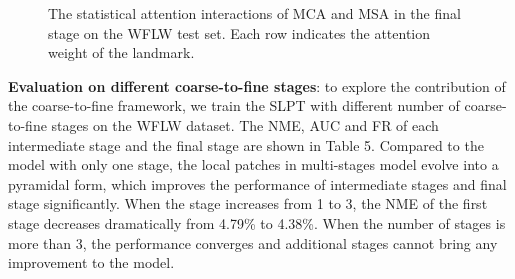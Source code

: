\documentclass[10pt,twocolumn,letterpaper]{article}
\begin{document}
\begin{figure*}[t!]
	\label{verifycluster}
	\centering
	\hspace{0.1cm}
	\hspace{0.1cm}
	\hspace{0.1cm}
	\hspace{0.1cm}
	\hspace{0.1cm}
	\hspace{0.1cm}
	\hspace{0.1cm}
	\hspace{0.1cm}
	\hspace{0.1cm}
	\hspace{0.1cm}
	\hspace{0.1cm}
	\hspace{0.1cm}	
	\caption{The statistical attention interactions of MCA and MSA in the final stage on the WFLW test set. Each row indicates the attention weight of the landmark.}
	\label{fig5}
\end{figure*}

\textbf{Evaluation on different coarse-to-fine stages}: to explore the contribution of the coarse-to-fine framework, we train the SLPT with different number of coarse-to-fine stages on the WFLW dataset. The NME, AUC and FR of each intermediate stage and the final stage are shown in Table 5. Compared to the model with only one stage, the local patches in multi-stages model evolve into a pyramidal form, which improves the performance of intermediate stages and final stage significantly. When the stage increases from 1 to 3, the NME of the first stage decreases dramatically from 4.79\% to 4.38\%. When the number of stages is more than 3, the performance converges and additional stages cannot bring any improvement to the model. 
\end{document}
